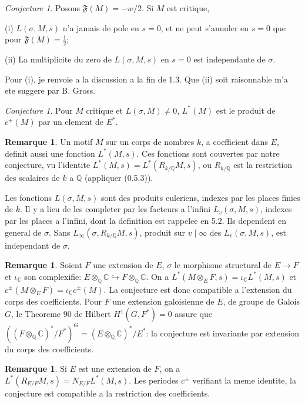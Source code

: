 \documentclass[12pt,a4paper]{article}
\theoremstyle{plain}
\theoremstyle{definition}
\newtheorem{remark}[definition]{Remarque}
\theoremstyle{remark}
\newtheorem{conjecture}[definition]{Conjecture}
\newcommand{\Q}{\mathbb{Q}}
\newcommand{\C}{\mathbb{C}}
\begin{document}
\begin{conjecture}\label{conj:2.7}
Posons $\mathfrak{F}(M) = -w/2$. Si $M$ est critique,

\textup{(i)} $L(\sigma, M, s)$ n'a jamais de pole en $s = 0$, et ne peut s'annuler en $s = 0$ que
pour $\mathfrak{F}(M) = \tfrac{1}{2}$;

\textup{(ii)} La multiplicite du zero de $L(\sigma, M, s)$ en $s = 0$ est independante de $\sigma$.
\end{conjecture}

Pour (i), je renvoie a la discussion a la fin de 1.3. Que (ii) soit raisonnable m'a ete
suggere par B. Gross.

\begin{conjecture}\label{conj:2.8}
Pour $M$ critique et $L(\sigma, M) \neq 0$, $L^*(M)$ est le produit de $c^+(M)$ par un
element de $E^*$.
\end{conjecture}

\begin{remark}
Un motif $M$ sur un corps de nombres $k$, a coefficient dans $E$, definit aussi une
fonction $L^*(M, s)$. Ces fonctions sont couvertes par notre conjecture, vu l'identite
$L^*(M, s) = L^*(R_{k/\Q} M, s)$, ou $R_{k/\Q}$ est la restriction des scalaires de $k$ a $\Q$
(appliquer (0.5.3)).

Les fonctions $L(\sigma, M, s)$ sont des produits euleriens, indexes par les places finies
de $k$. Il y a lieu de les completer par les facteurs a l'infini $L_v(\sigma, M, s)$, indexes par
les places a l'infini, dont la definition est rappelee en 5.2. Ils dependent en general de
$\sigma$. Sans $L_\infty(\sigma, R_{k/\Q} M, s)$, produit sur $v \mid \infty$ des $L_v(\sigma, M, s)$, est
independant de $\sigma$.
\end{remark}

\begin{remark}
Soient $F$ une extension de $E$, $\sigma$ le morphisme structural de $E \to F$ et $\iota_\C$ son
complexifie: $E \otimes_\Q \C \hookrightarrow F \otimes_\Q \C$. On a $L^*(M \otimes_E F, s) = \iota_\C L^*(M, s)$
et $c^\pm(M \otimes_E F) = \iota_\C c^\pm(M)$. La conjecture est donc compatible a l'extension du
corps des coefficients. Pour $F$ une extension galoisienne de $E$, de groupe de Galois
$G$, le Theoreme 90 de Hilbert $H^1(G, F^*) = 0$ assure que
$((F \otimes_\Q \C)^*/F^*)^G = (E \otimes_\Q \C)^*/E^*$: la conjecture est invariante par
extension du corps des coefficients.
\end{remark}

\begin{remark}
Si $E$ est une extension de $F$, on a $L^*(R_{E/F} M, s) = N_{E/F} L^*(M, s)$. Les periodes
$c^\pm$ verifiant la meme identite, la conjecture est compatible a la restriction des coefficients.
\end{remark}
\end{document}
